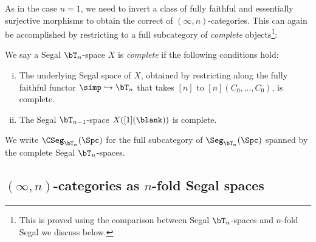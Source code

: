 \documentclass[a4paper,12pt]{article}
\begin{document}
\begin{remark}
  As in the case $n = 1$, we need to invert a class of fully faithful
  and essentially surjective morphisms to obtain the correct \icat{}
  of $(\infty,n)$-categories. This can again be accomplished by
  restricting to a full subcategory of \emph{complete}
  objects\footnote{This is proved using the comparison between Segal
    $\bT_{n}$-spaces and $n$-fold Segal we discuss below.}:
\end{remark}

\begin{defn}
  We say a Segal $\bT_{n}$-space $X$ is \emph{complete} if the
  following conditions hold:
  \begin{enumerate}[(i)]
  \item The underlying Segal space of $X$, obtained by restricting
    along the fully faithful functor $\simp \hookrightarrow \bT_{n}$
    that takes $[n]$ to $[n](C_{0},\dots,C_{0})$, is complete.
  \item The Segal $\bT_{n-1}$-space $X([1](\blank))$ is complete.
  \end{enumerate}
  We write $\CSeg_{\bT_{n}}(\Spc)$ for the full subcategory of
  $\Seg_{\bT_{n}}(\Spc)$ spanned by the complete Segal $\bT_{n}$-spaces.
\end{defn}

\subsection{$(\infty,n)$-categories as $n$-fold Segal
  spaces}\label{subsec:nfold}
\end{document}
